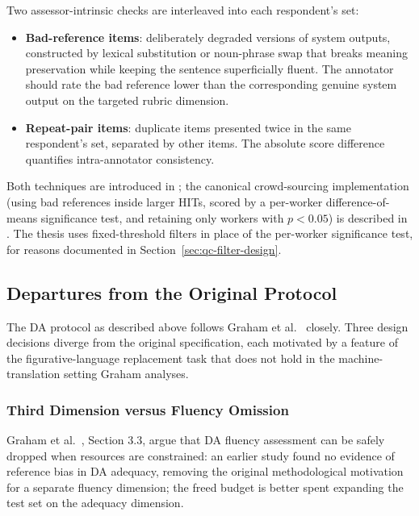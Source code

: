 Two assessor-intrinsic checks are interleaved into each respondent's set:
\begin{itemize}
    \item \textbf{Bad-reference items}: deliberately degraded versions of system outputs, constructed by lexical substitution or noun-phrase swap that breaks meaning preservation while keeping the sentence superficially fluent. The annotator should rate the bad reference lower than the corresponding genuine system output on the targeted rubric dimension.
    \item \textbf{Repeat-pair items}: duplicate items presented twice in the same respondent's set, separated by other items. The absolute score difference quantifies intra-annotator consistency.
\end{itemize}
Both techniques are introduced in \cite{Graham2013}; the canonical crowd-sourcing implementation (using bad references inside larger HITs, scored by a per-worker difference-of-means significance test, and retaining only workers with $p < 0.05$) is described in \cite{Graham2017}. The thesis uses fixed-threshold filters in place of the per-worker significance test, for reasons documented in Section~\ref{sec:qc-filter-design}.

\subsection{Departures from the Original Protocol}
\label{sec:da-departures}

The DA protocol as described above follows Graham et al.\ \cite{Graham2013,Graham2017} closely. Three design decisions diverge from the original specification, each motivated by a feature of the figurative-language replacement task that does not hold in the machine-translation setting Graham analyses.

\subsubsection{Third Dimension versus Fluency Omission}
\label{sec:rubric-vs-fluency}

Graham et al.\ \cite{Graham2017}, Section 3.3, argue that DA fluency assessment can be safely dropped when resources are constrained: an earlier study \cite{Graham2016a} found no evidence of reference bias in DA adequacy, removing the original methodological motivation for a separate fluency dimension; the freed budget is better spent expanding the test set on the adequacy dimension.


